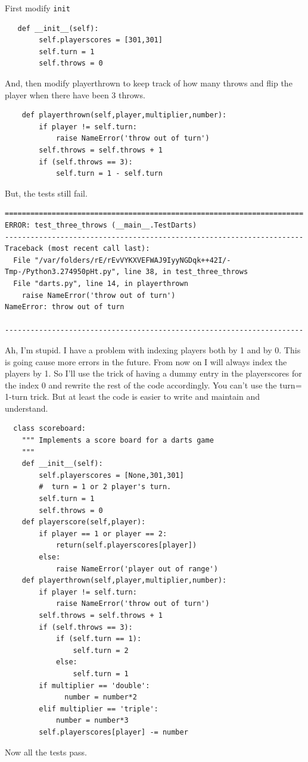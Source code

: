 \documentclass{paper}
\begin{document}
First modify {\tt init}
\begin{lstlisting}
   def __init__(self):
        self.playerscores = [301,301]
        self.turn = 1
        self.throws = 0
\end{lstlisting}
And, then  modify playerthrown to keep track of how many throws and flip the
player when there have been 3 throws.
\begin{lstlisting}
    def playerthrown(self,player,multiplier,number):
        if player != self.turn:
            raise NameError('throw out of turn')
        self.throws = self.throws + 1
        if (self.throws == 3):
            self.turn = 1 - self.turn
\end{lstlisting}
But, the tests still fail.
\begin{verbatim}
======================================================================
ERROR: test_three_throws (__main__.TestDarts)
----------------------------------------------------------------------
Traceback (most recent call last):
  File "/var/folders/rE/rEvVYKXVEFWAJ9IyyNGDqk++42I/-Tmp-/Python3.274950pHt.py", line 38, in test_three_throws
  File "darts.py", line 14, in playerthrown
    raise NameError('throw out of turn')
NameError: throw out of turn

----------------------------------------------------------------------
\end{verbatim}
Ah, I'm stupid. I have a problem with indexing players both by 1 and
by 0. This is going cause more errors in the future. From now on I
will always index the players by 1. So I'll use the trick of having a
dummy entry in the playerscores for the index 0 and rewrite the rest
of the code accordingly. You can't use the turn= 1-turn trick. But at
least the code is easier to write and maintain and understand.
\begin{lstlisting}
  class scoreboard:
    """ Implements a score board for a darts game
    """
    def __init__(self):
        self.playerscores = [None,301,301]
        #  turn = 1 or 2 player's turn.    
        self.turn = 1
        self.throws = 0
    def playerscore(self,player):
        if player == 1 or player == 2:
            return(self.playerscores[player])
        else:
            raise NameError('player out of range')
    def playerthrown(self,player,multiplier,number):
        if player != self.turn:
            raise NameError('throw out of turn')
        self.throws = self.throws + 1
        if (self.throws == 3):
            if (self.turn == 1):
                self.turn = 2
            else:
                self.turn = 1
        if multiplier == 'double':
              number = number*2
        elif multiplier == 'triple':
            number = number*3
        self.playerscores[player] -= number
\end{lstlisting}
Now all the tests pass.
\end{document}
